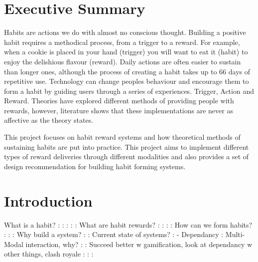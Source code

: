 

\section{Executive Summary}

Habits are actions we do with almost no conscious thought. Building a positive habit requires a methodical process, from a trigger to a reward. For example, when a cookie is placed in your hand (trigger) you will want to eat it (habit) to enjoy the delishious flavour (reward). Daily actions are often easier to sustain than longer ones, although the process of creating a habit takes up to 66 days of repetitive use. Technology can change peoples behaviour and encourage them to form a habit by guiding users through a series of experiences. Trigger, Action and Reward. Theories have explored different methods of providing people with rewards, however, literature shows that these implementations are never as affective as the theory states.

This project focuses on habit reward systems and how theoretical methods of sustaining habits are put into practice. This project aims to implement different types of reward deliveries through different modalities and also provides a set of design recommendation for building habit forming systems.


\section{Introduction}

What is a habit?
:\newline
:\newline
:\newline
:\newline
:\newline
What are habit rewards?
:\newline
:\newline
:\newline
:\newline
How can we form habits?
:\newline
:\newline
:\newline
Why build a system?
:\newline
:\newline
Current state of systems?
:\newline
- Dependancy
:\newline
Multi-Modal interaction, why?
:\newline
:\newline
Succeed better w gamification, look at dependancy w other things, clash royale
:\newline
:\newline
:\newline


